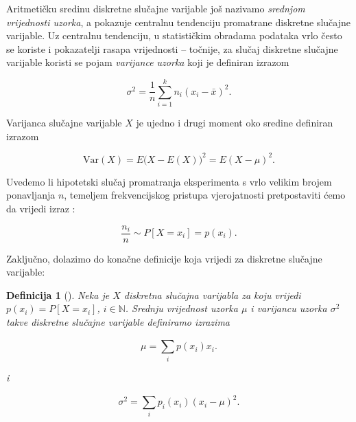 \documentclass[a4paper,12pt,oneside]{memoir}
\newtheorem{definition}{Definicija}[chapter]
\begin{document}
                Aritmetičku sredinu diskretne slučajne varijable još nazivamo \textit{srednjom vrijednosti uzorka}, a pokazuje centralnu tendenciju promatrane diskretne slučajne varijable. Uz centralnu tendenciju, u statističkim obradama podataka vrlo često se koriste i pokazatelji rasapa vrijednosti -- točnije, za slučaj diskretne slučajne varijable koristi se pojam \textit{varijance uzorka} koji je definiran izrazom

                \begin{equation}
                    \sigma^2=\frac{1}{n}\displaystyle\sum_{i=1}^{k}n_i(x_i-\bar{x})^2.
                \end{equation}

                Varijanca slučajne varijable $X$ je ujedno i drugi moment oko sredine definiran izrazom

                \begin{equation}
                    \mathrm{Var}(X)=E\big(X-E(X)\big)^2=E(X-\mu)^2.
                    \label{eq:variance}
                \end{equation}

                Uvedemo li hipotetski slučaj promatranja eksperimenta s vrlo velikim brojem ponavljanja $n$, temeljem frekvencijskog pristupa vjerojatnosti pretpostaviti ćemo da vrijedi izraz \cite{Priestley}:

                \begin{equation}
                    \frac{n_i}{n}\sim P[X=x_i]=p(x_i).
                \end{equation}

                Zaključno, dolazimo do konačne definicije koja vrijedi za diskretne slučajne varijable:

                \begin{definition}[\cite{Priestley}]
                    Neka je $X$ diskretna slučajna varijabla za koju vrijedi $p(x_i)=P[X=x_i]$, $i\in\mathbb{N}$. Srednju vrijednost uzorka $\mu$ i varijancu uzorka $\sigma^2$ takve diskretne slučajne varijable definiramo izrazima

                    \begin{equation}
                        \mu=\displaystyle\sum_{i}^{}p(x_i)x_i.
                        \label{eq:discrete_random_mu}
                    \end{equation}

                    i

                    \begin{equation}
                        \sigma^2=\displaystyle\sum_{i}^{}p_i(x_i)(x_i-\mu)^2.
                        \label{eq:discrete_random_sigma}
                    \end{equation}
                    \label{def:discrete_probabilistic_parameters}
                \end{definition}
\end{document}
